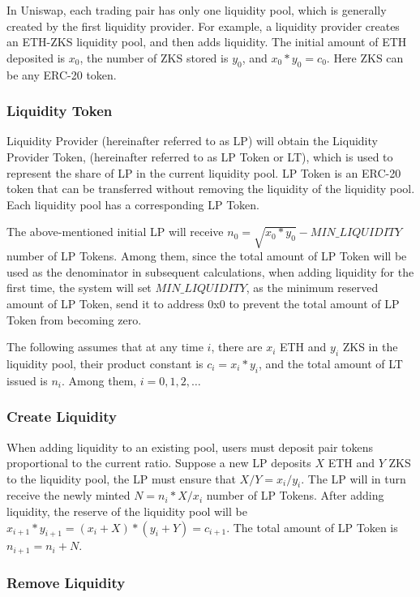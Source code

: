 \documentclass[]{template/llncs}
\begin{document}
In Uniswap, each trading pair has only one liquidity pool, which is generally created by the first liquidity provider. For example, a liquidity provider creates an ETH-ZKS liquidity pool, and then adds liquidity. The initial amount of ETH deposited is $x_0$, the number of ZKS stored is $y_0$, and $x_0*y_0 = c_0$. Here ZKS can be any ERC-20 token.


\subsubsection{Liquidity Token}

Liquidity Provider (hereinafter referred to as LP) will obtain the Liquidity Provider Token, (hereinafter referred to as LP Token or LT), which is used to represent the share of LP in the current liquidity pool. LP Token is an ERC-20 token that can be transferred without removing the liquidity of the liquidity pool. Each liquidity pool has a corresponding LP Token. 

The above-mentioned initial LP will receive $n_0 = \sqrt {x_0 * y_0} - MIN\_LIQUIDITY$ number of LP Tokens. Among them, since the total amount of LP Token will be used as the denominator in subsequent calculations, when adding liquidity for the first time, the system will set $MIN\_LIQUIDITY$, as the minimum reserved amount of LP Token, send it to address 0x0 to prevent the total amount of LP Token from becoming zero.

The following assumes that at any time $i$, there are $x_i$ ETH and $y_i$ ZKS in the liquidity pool, their product constant is $c_i = x_i * y_i$, and the total amount of LT issued is $n_i$. Among them, $i = 0, 1, 2, …$

\subsubsection{Create Liquidity}

When adding liquidity to an existing pool, users must deposit pair tokens proportional to the current ratio. Suppose a new LP deposits $X$ ETH and $Y$ ZKS to the liquidity pool, the LP must ensure that $X/Y = x_i/y_i$. The LP will in turn receive the newly minted $N = n_i*X/x_i$ number of LP Tokens. After adding liquidity, the reserve of the liquidity pool will be $x_{i+1}*y_{i+1} = (x_i+X)*(y_i+Y) = c_{i+1}$. The total amount of LP Token is $n_{i+1} = n_i + N$.


\subsubsection{Remove Liquidity}
\end{document}
